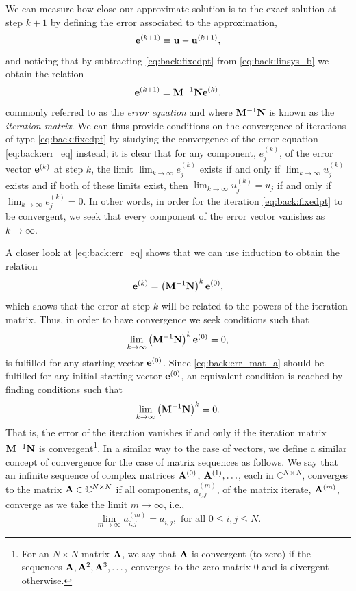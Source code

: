 We can measure how close our approximate solution is to the exact solution at step $k+1$ by defining the error associated to the approximation,
\begin{equation}
\mathbf{e}^{(k+1)}\equiv\mathbf{u}-\mathbf{u}^{(k+1)},
\end{equation}
and noticing that by subtracting \eqref{eq:back:fixedpt} from \eqref{eq:back:linsys_b} we obtain the relation
\begin{equation}\label{eq:back:err_eq}
\mathbf{e}^{(k+1)}=\mathbf{M}^{-1} \mathbf{N}\mathbf{e}^{(k)},
\end{equation}
commonly referred to as the \emph{error equation} and where $\mathbf{M}^{-1}\mathbf{N}$ is known as the \emph{iteration matrix}. We can thus provide conditions on the convergence of iterations of type \eqref{eq:back:fixedpt} by studying the convergence of the error equation \eqref{eq:back:err_eq} instead; it is clear that for any component, $e_j^{(k)}$, of the error vector $\mathbf{e}^{(k)}$ at step $k$, the limit $\lim_{k\to\infty}e_j^{(k)}$ exists if and only if $\lim_{k\to\infty}u_j^{(k)}$ exists and if both of these limits exist, then $\lim_{k\to\infty}u_j^{(k)}=u_j$ if and only if $\lim_{k\to\infty}e_j^{(k)}=0$.
In other words, in order for the iteration \eqref{eq:back:fixedpt} to be convergent, we seek that every component of the error vector vanishes as $k\to \infty$.

A closer look at \eqref{eq:back:err_eq} shows that we can use induction to
obtain the relation
\begin{equation}
\mathbf{e}^{(k)}=\left(\mathbf{M}^{-1} \mathbf{N}\right)^{k}\mathbf{e}^{(0)},
\end{equation}
which shows that the error at step $k$ will be related to the powers of the iteration matrix. Thus, in order to have convergence we seek conditions such that
\begin{equation}\label{eq:back:err_mat_a}
\lim_{k\to\infty}\left(\mathbf{M}^{-1} \mathbf{N}\right)^{k}\mathbf{e}^{(0)}=0,
\end{equation}
is fulfilled for any starting vector $\mathbf{e}^{(0)}$. Since \eqref{eq:back:err_mat_a} should be fulfilled for any initial starting vector $\mathbf{e}^{(0)}$, an equivalent condition is reached by finding conditions such that
\begin{equation}\label{eq:back:err_mat_b}
\lim_{k\to\infty}\left(\mathbf{M}^{-1} \mathbf{N}\right)^{k}=0.
\end{equation}
That is, the error of the iteration vanishes if and only if the iteration matrix $\mathbf{M}^{-1}\mathbf{N}$ is convergent\footnote{For an $N\times N$ matrix $\mathbf{A}$, we say that $\mathbf{A}$ is convergent (to zero) if the sequences $\mathbf{A},\mathbf{A}^2,\mathbf{A}^3,\ldots,$ converges to the zero matrix $0$ and is divergent otherwise.}. In a similar way to the case of vectors, we define a similar concept of convergence for the case of matrix sequences as follows. We say that an infinite sequence of complex matrices $\mathbf{A}^{(0)}$, $\mathbf{A}^{(1)},\ldots$, each in $\mathbb{C}^{N\times N}$, converges to the matrix $\mathbf{A}\in\mathbb{C}^{N\times N}$ if all components, $a_{i,j}^{(m)}$, of the matrix iterate, $\mathbf{A}^{(m)}$, converge as we take the limit $m\to \infty$, i.e.,
\begin{equation*}
\lim_{m\to\infty}a_{i,j}^{(m)}=a_{i,j},\text{ for all } 0\leq i,j\leq N.
\end{equation*}

